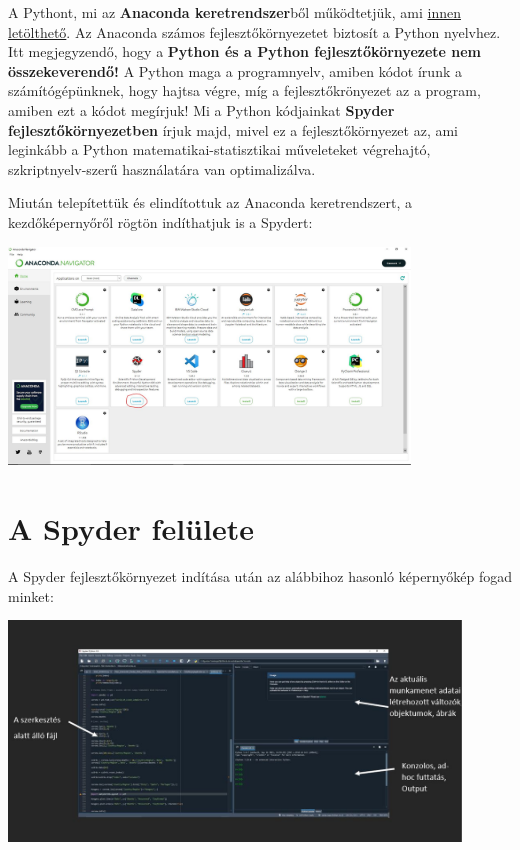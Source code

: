 \documentclass[
]{book}
\begin{document}
A Pythont, mi az \textbf{Anaconda keretrendszer}ből működtetjük, ami \href{https://www.anaconda.com/products/distribution}{innen letölthető}. Az Anaconda számos fejlesztőkörnyezetet biztosít a Python nyelvhez. Itt megjegyzendő, hogy a \textbf{Python és a Python fejlesztőkörnyezete nem összekeverendő!} A Python maga a programnyelv, amiben kódot írunk a számítógépünknek, hogy hajtsa végre, míg a fejlesztőkrönyezet az a program, amiben ezt a kódot megírjuk!
Mi a Python kódjainkat \textbf{Spyder fejlesztőkörnyezetben} írjuk majd, mivel ez a fejlesztőkörnyezet az, ami leginkább a Python matematikai-statisztikai műveleteket végrehajtó, szkriptnyelv-szerű használatára van optimalizálva.

Miután telepítettük és elindítottuk az Anaconda keretrendszert, a kezdőképernyőről rögtön indíthatjuk is a Spydert:

\includegraphics[width=0.8\textwidth,height=\textheight]{Anaconda.jpg}

\section{A Spyder felülete}\label{a-spyder-feluxfclete}

A Spyder fejlesztőkörnyezet indítása után az alábbihoz hasonló képernyőkép fogad minket:

\includegraphics[width=0.9\textwidth,height=\textheight]{Spyder.jpg}
\end{document}
